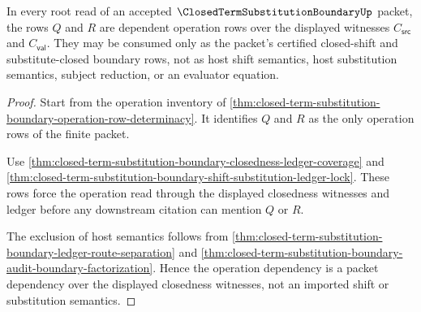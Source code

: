 \begin{theorem}
\label{thm:closed-term-substitution-boundary-root-operation-dependency}
In every root read of an accepted $\ClosedTermSubstitutionBoundaryUp$ packet, the rows $Q$ and $R$ are dependent operation rows over the displayed witnesses $C_{\mathsf{src}}$ and $C_{\mathsf{val}}$. They may be consumed only as the packet's certified closed-shift and substitute-closed boundary rows, not as host shift semantics, host substitution semantics, subject reduction, or an evaluator equation.
\end{theorem}
\begin{proof}
Start from the operation inventory of \autoref{thm:closed-term-substitution-boundary-operation-row-determinacy}. It identifies $Q$ and $R$ as the only operation rows of the finite packet.

Use \autoref{thm:closed-term-substitution-boundary-closedness-ledger-coverage} and \autoref{thm:closed-term-substitution-boundary-shift-substitution-ledger-lock}. These rows force the operation read through the displayed closedness witnesses and ledger before any downstream citation can mention $Q$ or $R$.

The exclusion of host semantics follows from \autoref{thm:closed-term-substitution-boundary-ledger-route-separation} and \autoref{thm:closed-term-substitution-boundary-audit-boundary-factorization}. Hence the operation dependency is a packet dependency over the displayed closedness witnesses, not an imported shift or substitution semantics.
\end{proof}

